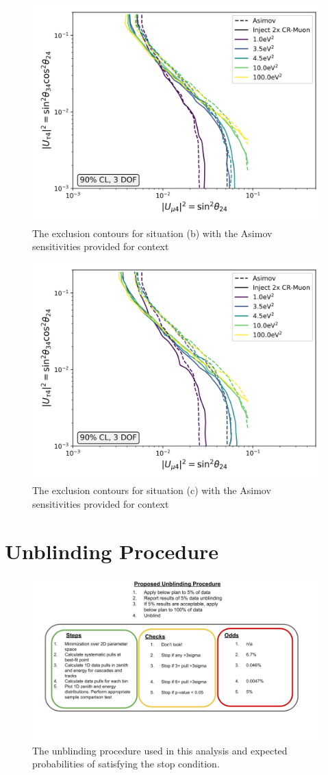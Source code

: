 \documentclass[main.tex]{subfiles}
\begin{document}
\begin{figure}
    \centering
    \includegraphics[width=0.7\linewidth]{figures/double_muon_mismodel_Realization_doublcr_sterile_0_cl0.9_dof3.png}
    \caption{The exclusion contours for situation (b) with the Asimov sensitivities provided for context}
\end{figure}   


\begin{figure}
    \centering
    \includegraphics[width=0.7\linewidth]{figures/double_muon_mismodel_worse_Realization_doublcr_sterile_0_cl0.9_dof3.png}
    \caption{The exclusion contours for situation (c) with the Asimov sensitivities provided for context}\label{fig:last_muon_sad}
\end{figure}    


\section{Unblinding Procedure}

\begin{figure}
    \centering
    \includegraphics[width=0.7\linewidth]{figures/unblinding.png}
    \caption{The unblinding procedure used in this analysis and expected probabilities of satisfying the stop condition.}\label{fig:unblind}
\end{figure}
\end{document}
